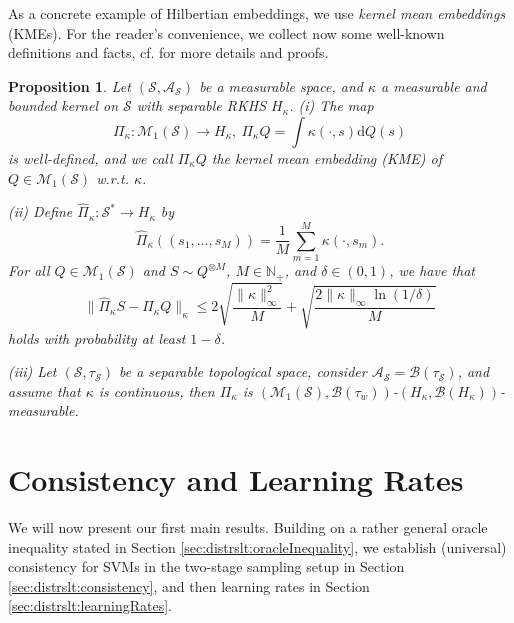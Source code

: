\documentclass[letterpaper]{article} %
\newcommand{\Np}{\mathbb{N}_+}
\newcommand{\setsys}[1]{\mathcal{#1}}
\newcommand{\distr}{\sim}
\newcommand{\Borel}{\mathcal{B}} %
\newcommand{\KME}[1]{\Pi_{#1}} %
\newcommand{\samplingSet}{\mathcal{S}} %
\newcommand{\distributions}{\mathcal{M}_1} %
\newcommand{\kKME}{\kappa} %
\newcommand{\KMEk}{\KME{\kKME}} %
\newcommand{\KMEhat}{\hat{\Pi}_\kKME} %
\newcommand{\defm}[1]{\emph{#1}}
\newtheorem{proposition}[theorem]{Proposition}
\begin{document}
As a concrete example of Hilbertian embeddings, we use \defm{kernel mean embeddings} (KMEs).
For the reader's convenience, we collect now some well-known definitions and facts, cf. \cite{lopezpaz2015towards,szabo2016learning} for more details and proofs.
\begin{proposition} \label{prop:distrslt:kmeBackground}
Let $(\samplingSet,\setsys{A}_\samplingSet)$ be a measurable space, and $\kKME$ a measurable and bounded kernel on $\samplingSet$ with separable RKHS $H_\kKME$.
(i) The map
\begin{equation}
    \KMEk: \distributions(\samplingSet) \rightarrow H_\kKME, \:
    \KMEk Q = \int \kKME(\cdot,s)\mathrm{d}Q(s)
\end{equation}
is well-defined, and we call $\KMEk Q$ the \emph{kernel mean embedding (KME)} of $Q\in\distributions(\samplingSet)$ w.r.t. $\kKME$.

(ii) Define $\KMEhat: \samplingSet^\ast \rightarrow H_\kKME$ by
\begin{equation}
    \KMEhat((s_1,\ldots,s_M)) = \frac1M \sum_{m=1}^M \kKME(\cdot,s_m).
\end{equation}
For all $Q\in \distributions(\samplingSet)$ and $S\distr Q^{\otimes M}$, $M\in\Np$, and $\delta\in(0,1)$, we have that
\begin{equation}
    \|\KMEhat S - \KMEk Q\|_\kKME \leq 2\sqrt{\frac{\|\kKME\|_\infty^2}{M}} + \sqrt{\frac{2\|\kKME\|_\infty \ln(1/\delta)}{M}}
\end{equation}
holds with probability at least $1-\delta$.

(iii) Let $(\samplingSet,\tau_\samplingSet)$ be a separable topological space, consider $\setsys{A}_\samplingSet=\Borel(\tau_\samplingSet)$, and assume that $\kKME$ is continuous, then $\KMEk$ is $(\distributions(\samplingSet), \Borel(\tau_w))$-$(H_\kKME, \Borel(H_\kKME))$-measurable.
\end{proposition}

\section{Consistency and Learning Rates} \label{sec:distrslt:consistencyAndLearningRates}
We will now present our first main results.
Building on a rather general oracle inequality stated in Section \ref{sec:distrslt:oracleInequality},
we establish (universal) consistency for SVMs in the two-stage sampling setup in Section \ref{sec:distrslt:consistency},
and then learning rates in Section \ref{sec:distrslt:learningRates}.
\end{document}
